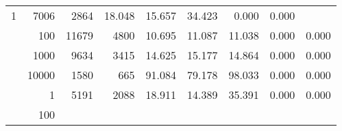 \begin{table}
\begin{tabular}{rrrrrrrrr}
					
					 
					\multirow{ 1 }{*}{ 1 } &
					
						
							    
							     7006  & 2864  
	                           & 18.048 & 15.657 & 34.423
	                           & 0.000 & 0.000  \\
	                
	            
					 &  
					 
					\multirow{ 1 }{*}{ 100 } &
					
						
							    
							     11679  & 4800  
	                           & 10.695 & 11.087 & 11.038
	                           & 0.000 & 0.000  \\
	                
	            
					 &  
					 
					\multirow{ 1 }{*}{ 1000 } &
					
						
							    
							     9634  & 3415  
	                           & 14.625 & 15.177 & 14.864
	                           & 0.000 & 0.000  \\
	                
	            
					 &  
					 
					\multirow{ 1 }{*}{ 10000 } &
					
						
							    
							     1580  & 665  
	                           & 91.084 & 79.178 & 98.033
	                           & 0.000 & 0.000  \\
	                
	            
	        
				\noalign{\smallskip}\hline
				\multirow{ 4 }{*}{ 2000000 } &
				
					
					 
					\multirow{ 1 }{*}{ 1 } &
					
						
							    
							     5191  & 2088  
	                           & 18.911 & 14.389 & 35.391
	                           & 0.000 & 0.000  \\
	                
	            
					 &  
					 
					\multirow{ 1 }{*}{ 100 } &
					
						
							    

\end{tabular}
\end{table}
